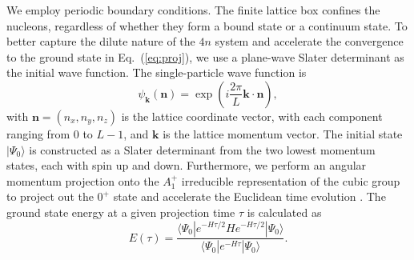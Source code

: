 \documentclass[aps,prl,showpacs,twocolumn,preprintnumbers,superscriptaddress,nofootinbib,floatfix,10pt]{revtex4-1}
\begin{document}
We employ periodic boundary conditions.
The finite lattice box confines the nucleons, regardless of whether they form a bound state or a continuum state.
To better capture the dilute nature of the $4n$ system and accelerate the convergence to the ground state in Eq.~(\ref{eq:proj}), we use a plane-wave Slater determinant as the initial wave function.
The single-particle wave function is
\begin{equation}\label{eq:}
  \psi_{\mathbf{k}}(\mathbf{n}) = \exp\left(i\frac{2\pi}{L} \mathbf{k} \cdot \mathbf{n}\right),
\end{equation}
with $\mathbf{n} = (n_x, n_y, n_z)$ is the lattice coordinate vector, with each component ranging from $0$ to $L - 1$, and
$\mathbf{k}$ is the lattice momentum vector.
The initial state $|\Psi_0\rangle$ is constructed as a Slater determinant from the two lowest momentum states, each with spin up and down.
Furthermore, we perform an angular momentum projection onto the $A_1^+$ irreducible representation of the cubic group to project out the $0^+$ state and accelerate the Euclidean time evolution \cite{Johnson:1982yq,Lu:2014xfa}.
The ground state energy at a given projection time $\tau$ is calculated as
\begin{equation}\label{eq:}
  E(\tau) = \frac{ \langle \Psi_0|e^{-H\tau/2} H e^{-H\tau/2} |\Psi_0\rangle }{ \langle \Psi_0|e^{-H\tau}|\Psi_0\rangle }.
\end{equation}
\end{document}
